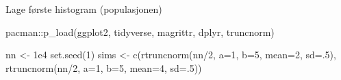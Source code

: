 \documentclass[
]{book}
\newenvironment{Shaded}{\begin{snugshade}}{\end{snugshade}}
\newcommand{\AttributeTok}[1]{\textcolor[rgb]{0.77,0.63,0.00}{#1}}
\newcommand{\DecValTok}[1]{\textcolor[rgb]{0.00,0.00,0.81}{#1}}
\newcommand{\FloatTok}[1]{\textcolor[rgb]{0.00,0.00,0.81}{#1}}
\newcommand{\FunctionTok}[1]{\textcolor[rgb]{0.00,0.00,0.00}{#1}}
\newcommand{\NormalTok}[1]{#1}
\newcommand{\OtherTok}[1]{\textcolor[rgb]{0.56,0.35,0.01}{#1}}
\newcommand{\SpecialCharTok}[1]{\textcolor[rgb]{0.00,0.00,0.00}{#1}}
\begin{document}
Lage første histogram (populasjonen)

\begin{Shaded}
\begin{Highlighting}[]
\NormalTok{pacman}\SpecialCharTok{::}\FunctionTok{p\_load}\NormalTok{(ggplot2, tidyverse, magrittr, dplyr, truncnorm)}

\NormalTok{nn }\OtherTok{\textless{}{-}} \FloatTok{1e4}
\FunctionTok{set.seed}\NormalTok{(}\DecValTok{1}\NormalTok{)}
\NormalTok{sims }\OtherTok{\textless{}{-}} \FunctionTok{c}\NormalTok{(}\FunctionTok{rtruncnorm}\NormalTok{(nn}\SpecialCharTok{/}\DecValTok{2}\NormalTok{, }\AttributeTok{a=}\DecValTok{1}\NormalTok{, }\AttributeTok{b=}\DecValTok{5}\NormalTok{, }\AttributeTok{mean=}\DecValTok{2}\NormalTok{, }\AttributeTok{sd=}\NormalTok{.}\DecValTok{5}\NormalTok{),}
                    \FunctionTok{rtruncnorm}\NormalTok{(nn}\SpecialCharTok{/}\DecValTok{2}\NormalTok{, }\AttributeTok{a=}\DecValTok{1}\NormalTok{, }\AttributeTok{b=}\DecValTok{5}\NormalTok{, }\AttributeTok{mean=}\DecValTok{4}\NormalTok{, }\AttributeTok{sd=}\NormalTok{.}\DecValTok{5}\NormalTok{))}


\end{Highlighting}
\end{Shaded}
\end{document}
